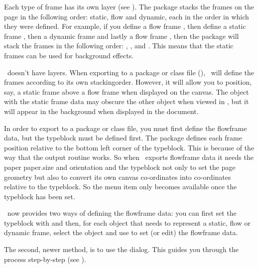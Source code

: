 Each type of frame has its own layer (see
).  The  package
stacks the frames on the page in the following order: static, flow
and dynamic, each in the order in which they were defined. For
example, if you define a flow frame  ,
then define a static frame  , then a
dynamic frame   and lastly a flow
frame  , then the 
package will stack the frames in the following order:
, ,  and .
This means that the static frames can be used for background
effects.

\FlowframTk\ doesn't have layers.
When exporting to a package or class file (),
\FlowframTk\ will define the frames according to its own
\gls{stackingorder}. However, it will allow you to position, say, a
static frame above a flow frame when displayed on the \gls{canvas}.
The object with the static frame data may obscure the other object
when viewed in \FlowframTk, but it will appear in the background
when displayed in the document.

In order to export to a package or class file, you must first define
the \gls{flowframe} data, but the \gls{typeblock} must be defined
first. The  package defines each frame position
relative to the bottom left corner of the \gls{typeblock}. This is
because of the way that the output routine works. So when
\FlowframTk\ exports \gls{flowframe} data it needs the paper
\gls{paper.size} and orientation and the \gls{typeblock} not only to
set the page geometry but also to convert its own \gls{canvas}
co-ordinates into co-ordinates relative to the \gls{typeblock}.
So the  menu item only becomes
available once the \gls{typeblock} has been set.

\FlowframTk\ now provides two ways of defining the \gls{flowframe}
data: you can first set the \gls{typeblock} with 
 and then, for each \gls{object}
that needs to represent a static, flow or dynamic frame, select the
\gls*{object} and use  to set (or
edit) the \gls{flowframe} data.

The second, newer method, is to use the  dialog.
This guides you through the process step-by-step (see
).


